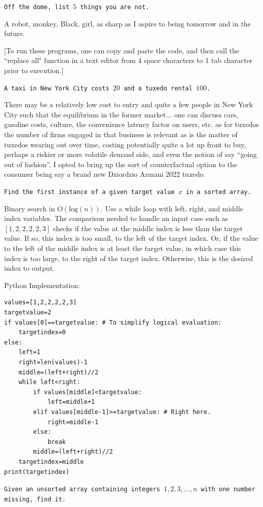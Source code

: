 \texttt{Off the dome, list $5$ things you are not.}

A robot, monkey, Black, girl, as sharp as I aspire to being tomorrow and in the future.

[To run these programs, one can copy and paste the code, and then call the ``replace all" function in a text editor from 4 space characters to 1 tab character prior to execution.]

\texttt{A taxi in New York City costs $20$ and a tuxedo rental $100$.}

There may be a relatively low cost to entry and quite a few people in New York City such that the equilibrium in the former market... one can discuss cars, gasoline costs, culture, the convenience latency factor on users, etc. as for tuxedos the number of firms engaged in that business is relevant as is the matter of tuxedos wearing out over time, costing potentially quite a lot up front to buy, perhaps a riskier or more volatile demand side, and even the notion of say ``going out of fashion''. I opted to bring up the sort of counterfactual option to the consumer being say a brand new Dziordzio Armani 2022 tuxedo.

\texttt{Find the first instance of a given target value $x$ in a sorted array.}

Binary search in $O(\text{log}(n))$. Use a while loop with left, right, and middle index variables. The comparison needed to handle an input case such as $[1,2,2,2,2,3]$ checks if the value at the middle index is less than the target value. If so, this index is too small, to the left of the target index. Or, if the value to the left of the middle index is at least the target value, in which case this index is too large, to the right of the target index. Otherwise, this is the desired index to output.

Python Implementation:

\begin{verbatim}
values=[1,2,2,2,2,3]
targetvalue=2
if values[0]==targetvalue: # To simplify logical evaluation:
    targetindex=0
else:
    left=1
    right=len(values)-1
    middle=(left+right)//2
    while left<right:
        if values[middle]<targetvalue:
            left=middle+1
        elif values[middle-1]>=targetvalue: # Right here.
            right=middle-1
        else:
            break
        middle=(left+right)//2
    targetindex=middle
print(targetindex)
\end{verbatim}

\texttt{Given an unsorted array containing integers $1,2,3,\dots,n$ with one number missing, find it.}


